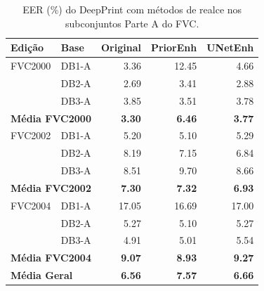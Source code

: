 \begin{table}[htbp]
\centering
\small
\caption{EER (\%) do DeepPrint com métodos de realce nos subconjuntos Parte A do FVC.}\label{tab:eer_deepprint_enh}
\setlength{\tabcolsep}{8pt}
\begin{tabular}{ll rrr}
\toprule
\textbf{Edição} & \textbf{Base} & \textbf{Original} & \textbf{PriorEnh} & \textbf{UNetEnh} \\
\midrule
FVC2000 & DB1-A & 3.36 & 12.45 & 4.66 \\
 & DB2-A & 2.69 & 3.41 & 2.88 \\
 & DB3-A & 3.85 & 3.51 & 3.78 \\
\cmidrule{2-5}
\multicolumn{2}{l}{\textbf{Média FVC2000}} & \textbf{3.30} & \textbf{6.46} & \textbf{3.77} \\
\midrule
FVC2002 & DB1-A & 5.20 & 5.10 & 5.29 \\
 & DB2-A & 8.19 & 7.15 & 6.84 \\
 & DB3-A & 8.51 & 9.70 & 8.66 \\
\cmidrule{2-5}
\multicolumn{2}{l}{\textbf{Média FVC2002}} & \textbf{7.30} & \textbf{7.32} & \textbf{6.93} \\
\midrule
FVC2004 & DB1-A & 17.05 & 16.69 & 17.00 \\
 & DB2-A & 5.27 & 5.10 & 5.27 \\
 & DB3-A & 4.91 & 5.01 & 5.54 \\
\cmidrule{2-5}
\multicolumn{2}{l}{\textbf{Média FVC2004}} & \textbf{9.07} & \textbf{8.93} & \textbf{9.27} \\
\midrule[\heavyrulewidth]
\multicolumn{2}{l}{\textbf{Média Geral}} & \textbf{6.56} & \textbf{7.57} & \textbf{6.66} \\
\bottomrule
\end{tabular}
\end{table}

